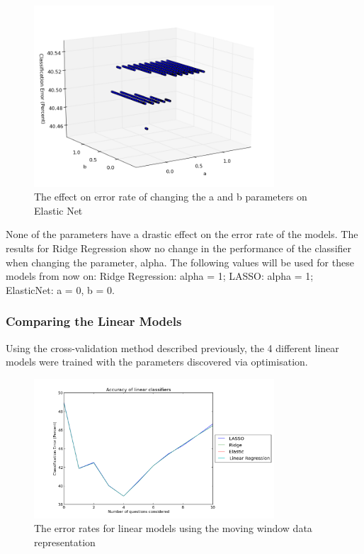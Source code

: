 \begin{figure}[h!]
\centering
\includegraphics[width=0.8\textwidth]{images/elasticnetab.png}
\caption{The effect on error rate of changing the a and b parameters on Elastic Net}
\label{fig:elasticnetab}
\end{figure}

None of the parameters have a drastic effect on the error rate of the models. The results for Ridge Regression show no change in the performance of the classifier when changing the parameter, alpha. The following values will be used for these models from now on: Ridge Regression: alpha = 1; LASSO: alpha = 1; ElasticNet: a = 0, b = 0.

\subsubsection{Comparing the Linear Models}
Using the cross-validation method described previously, the 4 different linear models were trained with the parameters discovered via optimisation.

\begin{figure}[h!]
\centering
\includegraphics[width=0.8\textwidth]{images/linearmodelsmovingwindow.png}
\caption{The error rates for linear models using the moving window data representation}
\label{fig:linearmodelsmovingwindow}
\end{figure}

